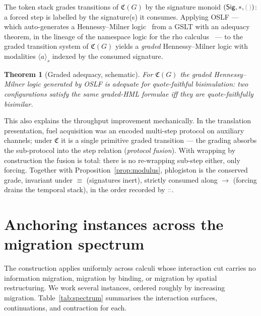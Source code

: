 \documentclass[11pt]{article}
\theoremstyle{definition}
\theoremstyle{plain}
\newtheorem{theorem}[definition]{Theorem}
\newcommand{\dec}[1]{\textcolor{costgray}{#1}}   %
\newcommand{\Sig}{\mathsf{Sig}}
\newcommand{\Cost}{\mathfrak{C}}              %
\newcommand{\cons}{\mathbin{\dec{\dblcolon}}}  %
\newcommand{\nil}{\dec{(\,)}}                  %
\newcommand{\red}{\longrightarrow}
\newcommand{\Seq}{\equiv}
\begin{document}
The token stack grades transitions of $\Cost(G)$ by the signature monoid
$(\Sig,*,\nil)$: a forced step is labelled by the signature(s) it
consumes. Applying OSLF --- which auto-generates a Hennessy--Milner
logic~\cite{HennessyMilner1985} from a GSLT with an adequacy theorem, in
the lineage of the namespace logic for the rho
calculus~\cite{NamespaceLogic} --- to the graded transition system
of $\Cost(G)$ yields a \emph{graded} Hennessy--Milner logic with
modalities $\langle a\rangle_s$ indexed by the consumed signature.

\begin{theorem}[Graded adequacy, schematic]
\label{thm:adequacy}
For $\Cost(G)$ the graded Hennessy--Milner logic generated by OSLF is
adequate for quote-faithful bisimulation: two configurations satisfy the
same graded-HML formulae iff they are quote-faithfully bisimilar.
\end{theorem}

This also explains the throughput improvement mechanically. In the
translation presentation, fuel acquisition was an encoded multi-step
protocol on auxiliary channels; under $\Cost$ it is a single primitive
graded transition --- the grading absorbs the sub-protocol into the step
relation (\emph{protocol fusion}). With wrapping by construction the
fusion is total: there is no re-wrapping sub-step either, only forcing.
Together with Proposition~\ref{prop:modulus}, phlogiston is the conserved
grade, invariant under $\Seq$ (signatures inert), strictly consumed along
$\red$ (forcing drains the temporal stack), in the order recorded by
$\cons$.

\section{Anchoring instances across the migration spectrum}
\label{sec:examples}

The construction applies uniformly across calculi whose interaction cut
carries no information migration, migration by binding, or migration by
spatial restructuring. We work several instances, ordered roughly by
increasing migration.
Table~\ref{tab:spectrum} summarises the interaction surfaces,
continuations, and contraction for each.
\end{document}
